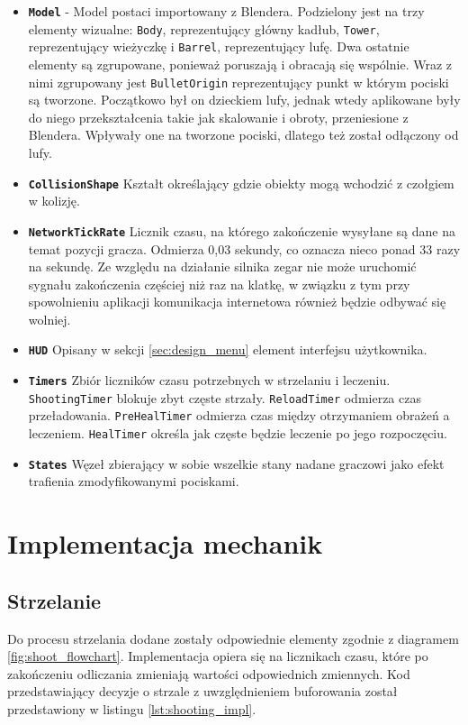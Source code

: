 \begin{itemize}
    \item \textbf{\texttt{Model}} - Model postaci importowany z Blendera. Podzielony jest na trzy elementy wizualne: \texttt{Body}, reprezentujący główny kadłub, \texttt{Tower}, reprezentujący wieżyczkę i \texttt{Barrel}, reprezentujący lufę. Dwa ostatnie elementy są zgrupowane, ponieważ poruszają i obracają się wspólnie. Wraz z nimi zgrupowany jest \texttt{BulletOrigin} reprezentujący punkt w którym pociski są tworzone. Początkowo był on dzieckiem lufy, jednak wtedy aplikowane były do niego przekształcenia takie jak skalowanie i obroty, przeniesione z Blendera. Wpływały one na tworzone pociski, dlatego też został odłączony od lufy.  
    \item \textbf{\texttt{CollisionShape}} Kształt określający gdzie obiekty mogą wchodzić z czołgiem w kolizję. 
    \item \textbf{\texttt{NetworkTickRate}} Licznik czasu, na którego zakończenie wysyłane są dane na temat pozycji gracza. Odmierza 0,03 sekundy, co oznacza nieco ponad 33 razy na sekundę. Ze względu na działanie silnika zegar nie może uruchomić sygnału zakończenia częściej niż raz na klatkę, w związku z tym przy spowolnieniu aplikacji komunikacja internetowa również będzie odbywać się wolniej.
    \item \textbf{\texttt{HUD}} Opisany w sekcji \ref{sec:design_menu} element interfejsu użytkownika.
    \item \textbf{\texttt{Timers}} Zbiór liczników czasu potrzebnych w strzelaniu i leczeniu. \texttt{ShootingTimer} blokuje zbyt częste strzały. \texttt{ReloadTimer} odmierza czas przeładowania. \texttt{PreHealTimer} odmierza czas między otrzymaniem obrażeń a leczeniem. \texttt{HealTimer} określa jak częste będzie leczenie po jego rozpoczęciu. 
    \item \textbf{\texttt{States}} Węzeł zbierający w sobie wszelkie stany nadane graczowi jako efekt trafienia zmodyfikowanymi pociskami.
\end{itemize} 

\section{Implementacja mechanik}
\subsection{Strzelanie}
Do procesu strzelania dodane zostały odpowiednie elementy zgodnie z diagramem \ref{fig:shoot_flowchart}. Implementacja opiera się na licznikach czasu, które po zakończeniu odliczania zmieniają wartości odpowiednich zmiennych. Kod przedstawiający decyzje o strzale z uwzględnieniem buforowania został przedstawiony w listingu \ref{lst:shooting_impl}.

